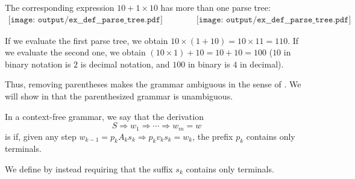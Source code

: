 \begin{example}
\begin{thmenum}
    The corresponding expression \( 10 + 1 \times 10 \) has more than one parse tree:
    \begin{equation*}
      \begin{aligned}
        \texttt{[image: output/ex\_\_def\_\_parse\_tree.pdf]}
        \qquad\qquad
        \texttt{[image: output/ex\_\_def\_\_parse\_tree.pdf]}
      \end{aligned}
    \end{equation*}

    If we evaluate the first parse tree, we obtain \( 10 \times (1 + 10) = 10 \times 11 = 110 \). If we evaluate the second one, we obtain \( (10 \times 1) + 10 = 10 + 10 = 100 \) (\( 10 \) in binary notation is \( 2 \) is decimal notation, and \( 100 \) in binary is \( 4 \) in decimal).

    Thus, removing parentheses makes the grammar ambiguous in the sense of . We will show in  that the parenthesized grammar is unambiguous.
  \end{thmenum}
\end{example}

\begin{definition}\label{def:leftmost_derivation}
  In a context-free grammar, we say that the derivation
  \begin{equation*}
    S \Rightarrow w_1 \Rightarrow \cdots \Rightarrow w_m = w
  \end{equation*}
  is  if, given any step \( w_{k-1} = p_k A_k s_k \Rightarrow p_k v_k s_k = w_k \), the prefix \( p_k \) contains only terminals.

  We define  by instead requiring that the suffix \( s_k \) contains only terminals.
\end{definition}

